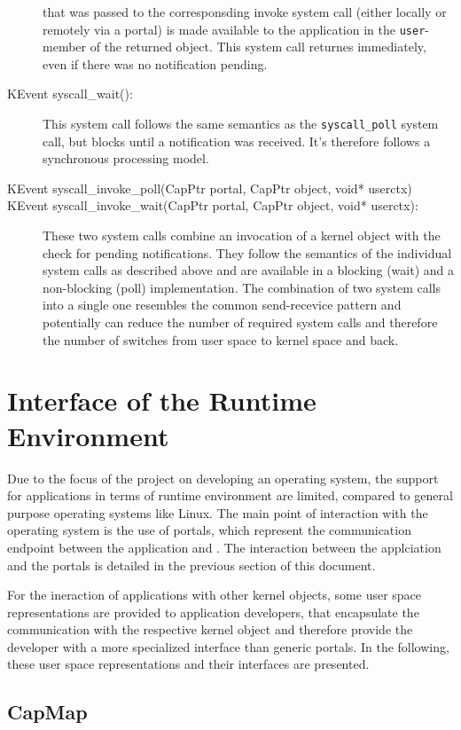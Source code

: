 \begin{description}
that was passed to the corresponsding invoke system call (either locally or
remotely via a portal) is made available to the application in the
\texttt{user}-member of the returned object. This system call returnes
immediately, even if there was no notification pending.
\item[KEvent syscall\_wait():] This system call follows the same semantics as
the \texttt{syscall\_poll} system call, but blocks until a notification was
received. It's therefore follows a synchronous processing model.
\item[KEvent syscall\_invoke\_poll(CapPtr portal, CapPtr object, void* userctx)]
\item[KEvent syscall\_invoke\_wait(CapPtr portal, CapPtr object, void*
userctx):] These two system calls combine an invocation of a kernel object with
the check for pending notifications. They follow the semantics of the individual
system calls as described above and are available in a blocking (wait) and a
non-blocking (poll) implementation. The combination of two system calls into a
single one resembles the common send-recevice pattern and potentially can reduce
the number of required system calls and therefore the number of switches from
user space to kernel space and back.
\end{description}

\section{Interface of the \mythos Runtime Environment} Due to the focus of the
\mythos project on developing an operating system, the support for applications
in terms of runtime environment are limited, compared to general purpose
operating systems like Linux. The main point of interaction with the operating
system is the use of portals, which represent the communication endpoint between
the application and \mythos. The interaction between the applciation and the
portals is detailed in the previous section of this document.

For the ineraction of applications with other kernel objects, some user space
representations are provided to application developers, that encapsulate the
communication with the respective kernel object and therefore provide the
developer with a more specialized interface than generic portals. In the
following, these user space representations and their interfaces are presented.

\subsection{CapMap}

